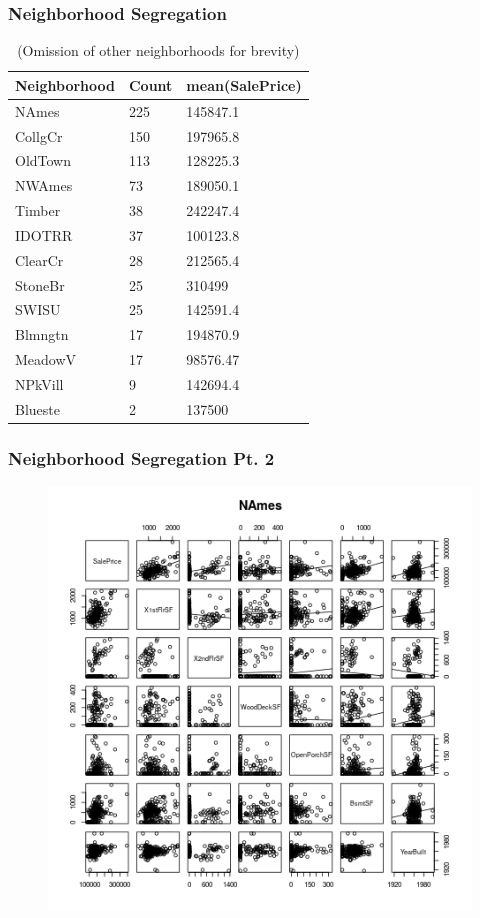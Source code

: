 \documentclass{beamer}
\begin{document}
\begin{frame}
\frametitle{Neighborhood Segregation}
\begin{table}
\begin{tabular}{l l l}
\toprule
\textbf{Neighborhood} & \textbf{Count} & \textbf{mean(SalePrice)}\\
\midrule
NAmes        &   225 &        145847.1 \\
CollgCr      &   150 &        197965.8 \\
OldTown      &   113 &        128225.3 \\
NWAmes       &    73 &        189050.1 \\
Timber       &    38 &        242247.4 \\
IDOTRR       &    37 &        100123.8 \\
ClearCr      &    28 &        212565.4 \\
StoneBr      &    25 &          310499 \\
SWISU        &    25 &        142591.4 \\
Blmngtn      &    17 &        194870.9 \\
MeadowV      &    17 &        98576.47 \\
NPkVill      &     9 &        142694.4 \\
Blueste      &     2 &          137500 \\
\bottomrule
\end{tabular}
\caption{(Omission of other neighborhoods for brevity)}
\end{table}
\end{frame}


\begin{frame}
\frametitle{Neighborhood Segregation Pt. 2}
\begin{figure}
\includegraphics[width=0.75\linewidth,keepaspectratio=true]{img/pairNAmes.png}
\end{figure}
\end{frame}
\end{document}
